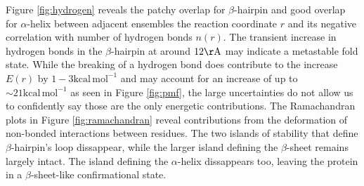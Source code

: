 \documentclass{article}[12pt]
\numberwithin{equation}{section}
\begin{document}
\pagebreak
Figure \ref{fig:hydrogen} reveals the patchy overlap for $\beta$-hairpin and
good overlap for $\alpha$-helix between adjacent ensembles
the reaction coordinate $r$ and its negative correlation with number of hydrogen
bonds $n(r)$. The transient increase in hydrogen bonds in the $\beta$-hairpin at
around $12\mathrm{\AA}$ may indicate a metastable fold state. While the breaking
of a hydrogen bond does contribute to the increase $E(r)$ by
$1-3\mathrm{kcal\,mol^{-1}}$ and may account for an increase of up to
$\sim21\mathrm{kcal\,mol^{-1}}$ as seen in Figure \ref{fig:pmf}, the large
uncertainties do not allow us to confidently say those are the only energetic
contributions. The Ramachandran plots in
Figure \ref{fig:ramachandran} reveal contributions from the deformation of non-bonded
interactions between residues. The two islands of stability that define $\beta$-hairpin's
loop dissappear, while the larger island defining the $\beta$-sheet remains largely
intact. The island defining the $\alpha$-helix dissappears too, leaving the
protein in a $\beta$-sheet-like confirmational state.
\end{document}
